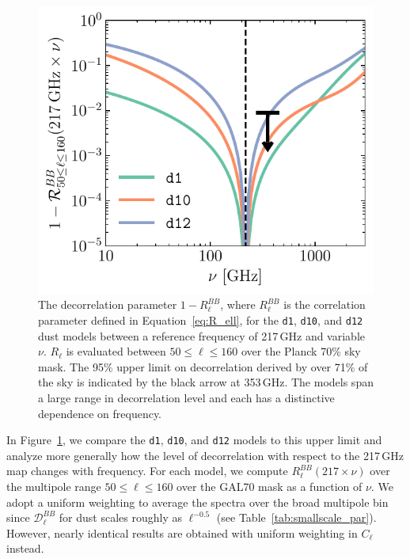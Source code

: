 \documentclass[twocolumn]{aastex631}
\begin{document}
\begin{figure}
    \centering
    \includegraphics[width=\columnwidth]{figures/decorrelation_dust.pdf}
    \caption{The decorrelation parameter $1-R_\ell^{BB}$, where $R_\ell^{BB}$ is the correlation parameter defined in Equation~\eqref{eq:R_ell}, for the \texttt{d1}, \texttt{d10}, and \texttt{d12} dust models between a reference frequency of 217\,GHz and variable $\nu$. $R_\ell$ is evaluated between $50 \leq \ell \leq 160$ over the Planck 70\% sky mask. The 95\% upper limit on decorrelation derived by \citet{planck2016-l11A} over 71\% of the sky is indicated by the black arrow at 353\,GHz. The models span a large range in decorrelation level and each has a distinctive dependence on frequency.}
    \label{fig:decorrelation}
\end{figure}

In Figure~\ref{fig:decorrelation}, we compare the \texttt{d1}, \texttt{d10}, and \texttt{d12} models to this upper limit and analyze more generally how the level of decorrelation with respect to the 217\,GHz map changes with frequency. For each model, we compute $R_\ell^{BB}\left(217\times\nu\right)$ over the multipole range $50 \leq \ell \leq 160$ over the GAL70 mask as a function of $\nu$. We adopt a uniform weighting to average the spectra over the broad multipole bin since $\mathcal{D}_\ell^{BB}$ for dust scales roughly as $\ell^{-0.5}$ (see Table~\ref{tab:smallscale_par}). However, nearly identical results are obtained with uniform weighting in $C_\ell$ instead.
\end{document}
